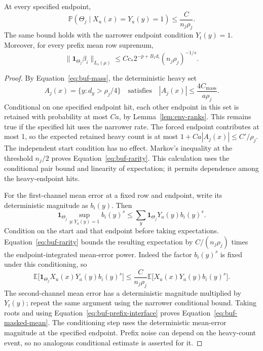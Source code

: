 \begin{lemma}
\label{lem:buf-rarity}
At every specified endpoint,
\begin{equation}
 \mathbb P(\Theta_j\mid X_u(x)=Y_a(y)=1)
      \leq\frac{C}{n_j\rho_j}.
 \label{eq:buf-rarity}
\end{equation}
The same bound holds with the narrower endpoint condition $Y_t(y)=1$.
Moreover, for every prefix mean row supremum,
\begin{equation}
 \|\mathbf1_{\Theta_j}\beta_i\|_{L_s(\mu)}
      \leq Cc_*2^{-p+B_1d_i}(n_j\rho_j)^{-1/s}.
 \label{eq:buf-masked-mean}
\end{equation}
\end{lemma}
\begin{proof}
By Equation~\eqref{eq:buf-mass}, the deterministic heavy set
\[
 A_j(x)=\{y:d_y>\rho_j/4\}
 \quad\text{satisfies}\quad
 |A_j(x)|\leq\frac{4C_{\mathrm{mass}}}{a\rho_j}.
\]
Conditional on one specified endpoint
hit, each other endpoint in this set is retained with probability at most
$Ca$, by Lemma~\ref{lem:env-ranks}.  This remains true if the
specified hit uses the narrower rate.  The forced endpoint contributes
at most 1, so the expected retained heavy count is at most
$1+Ca|A_j(x)|\leq C'/\rho_j$.
The independent start condition has no effect.  Markov's inequality
at the threshold $n_j/2$ proves Equation~\eqref{eq:buf-rarity}.
This calculation uses the conditional pair bound and linearity of
expectation; it permits dependence among the heavy-endpoint hits.

For the first-channel mean error at a fixed row and endpoint, write its
deterministic magnitude as $b_i(y)$.  Then
\[
 \mathbf1_{\Theta_j}\sup_{y:Y_a(y)=1}b_i(y)^s
       \leq\sum_y\mathbf1_{\Theta_j}Y_a(y)b_i(y)^s.
\]
Condition on the start and that endpoint before taking expectations.
Equation~\eqref{eq:buf-rarity} bounds the resulting expectation by
$C/(n_j\rho_j)$ times the endpoint-integrated mean-error power.
Indeed the factor $b_i(y)^s$ is fixed under this conditioning, so
\[
 \mathbb E\bigl[\mathbf1_{\Theta_j}X_u(x)Y_a(y)b_i(y)^s\bigr]
 \leq\frac{C}{n_j\rho_j}
       \mathbb E\bigl[X_u(x)Y_a(y)b_i(y)^s\bigr].
\]
The second-channel mean error has a deterministic magnitude multiplied
by $Y_t(y)$; repeat the same argument using the narrower conditional
bound.  Taking roots and using Equation~\eqref{eq:buf-prefix-interface}
proves Equation~\eqref{eq:buf-masked-mean}.  The conditioning step uses
the deterministic mean-error magnitude at the specified endpoint.
Prefix noise can depend on the heavy-count event, so no analogous
conditional estimate is asserted for it.
\end{proof}

